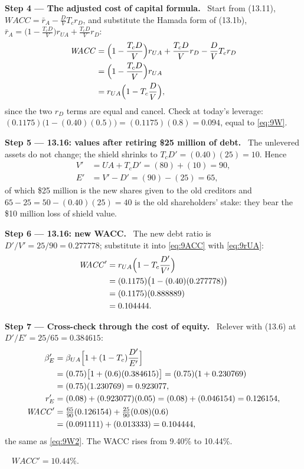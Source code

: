 \documentclass[11pt,a4paper]{article}
\numberwithin{equation}{section}
\newcommand{\step}[2]{\par\smallskip\noindent\textbf{Step #1 --- #2.}~}
\newcommand{\answer}[1]{\par\smallskip\noindent\fbox{\textbf{Answer #1.}}~}
\begin{document}
\step{4}{The adjusted cost of capital formula} Start from (13.11),
$\mathit{WACC}=\bar r_A-\tfrac{D}{V}T_c r_D$, and substitute the Hamada form of (13.1b),
$\bar r_A=\bigl(1-\tfrac{T_cD}{V}\bigr)r_{UA}+\tfrac{T_cD}{V}r_D$:
\begin{align}
  \mathit{WACC} &= \Bigl(1-\frac{T_cD}{V}\Bigr)r_{UA}+\frac{T_cD}{V}r_D-\frac{D}{V}T_c r_D \nonumber\\
      &= \Bigl(1-\frac{T_cD}{V}\Bigr)r_{UA} \nonumber\\
      &= r_{UA}\Bigl(1-T_c\frac{D}{V}\Bigr), \label{eq:9ACC}
\end{align}
since the two $r_D$ terms are equal and cancel. Check at today's leverage:
$(0.1175)\bigl(1-(0.40)(0.5)\bigr)=(0.1175)(0.8)=0.094$, equal to \eqref{eq:9W}.

\step{5}{13.16: values after retiring \$25 million of debt} The unlevered assets do not change;
the shield shrinks to $T_cD'=(0.40)(25)=10$. Hence
\begin{align}
  V' &= \mathit{UA}+T_cD' = (80)+(10) = 90, \label{eq:9V}\\
  E' &= V'-D' = (90)-(25) = 65, \nonumber
\end{align}
of which \$25 million is the new shares given to the old creditors and
$65-25=50-(0.40)(25)=40$ is the old shareholders' stake: they bear the \$10 million loss of
shield value.

\step{6}{13.16: new WACC} The new debt ratio is $D'/V'=25/90=0.277778$; substitute it into
\eqref{eq:9ACC} with \eqref{eq:9rUA}:
\begin{align}
  \mathit{WACC}' &= r_{UA}\Bigl(1-T_c\frac{D'}{V'}\Bigr) \label{eq:9W2}\\
      &= (0.1175)\bigl(1-(0.40)(0.277778)\bigr) \nonumber\\
      &= (0.1175)(0.888889) \nonumber\\
      &= 0.104444. \nonumber
\end{align}

\step{7}{Cross-check through the cost of equity} Relever with (13.6) at $D'/E'=25/65=0.384615$:
\begin{align}
  \beta_E' &= \beta_{UA}\Bigl[1+(1-T_c)\frac{D'}{E'}\Bigr] \nonumber\\
      &= (0.75)\bigl[1+(0.6)(0.384615)\bigr] = (0.75)(1+0.230769) \nonumber\\
      &= (0.75)(1.230769) = 0.923077, \nonumber\\
  r_E' &= (0.08)+(0.923077)(0.05) = (0.08)+(0.046154) = 0.126154, \nonumber\\
  \mathit{WACC}' &= \tfrac{65}{90}(0.126154)+\tfrac{25}{90}(0.08)(0.6) \nonumber\\
      &= (0.091111)+(0.013333) = 0.104444, \nonumber
\end{align}
the same as \eqref{eq:9W2}. The WACC rises from 9.40\% to 10.44\%.
\answer{(13.16)} $\mathit{WACC}'=10.44\%$.
\end{document}

